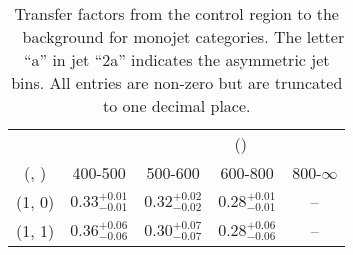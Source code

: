 \begin{table}[h!]
\tiny
\centering
\caption{Transfer factors from the \gj control region to the \zInv~ background for monojet categories. The letter ``a'' in jet \eg ``2a''  indicates the asymmetric jet bins. All entries are non-zero but are truncated to one decimal place.\label{tab:tf_gj_zinv_mono}}
\begin{tabular}
{ccccc}
	\hline\hline
&	& \multicolumn{4}{c}{\scalht (\gev)} \\ 
	 (\njet,  \nb) & 400-500 & 500-600 & 600-800 & 800-$\infty$ \\ [0.8ex] 
\hline
	(1, 0) & $0.33^{+ 0.01 }_{- 0.01 }$ & $0.32^{+ 0.02 }_{- 0.02 }$ & $0.28^{+ 0.01 }_{- 0.01 }$ & -- \\[0.5ex] 
	(1, 1) & $0.36^{+ 0.06 }_{- 0.06 }$ & $0.30^{+ 0.07 }_{- 0.07 }$ & $0.28^{+ 0.06 }_{- 0.06 }$ & -- \\[0.5ex] 
	\hline
	\hline
\end{tabular}
\end{table}
